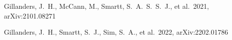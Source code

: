 \documentclass[twocolumn, twocolappendix]{aastex63}
\begin{document}
\begin{itemize}
\begin{thebibliography}{}


 Gillanders, J.~H., McCann, M., Smartt, S.~A.~S.~S.~J., et al.\ 2021, arXiv:2101.08271


 Gillanders, J.~H., Smartt, S.~J., Sim, S.~A., et al.\ 2022, arXiv:2202.01786



























\end{thebibliography}
\end{itemize}
\end{document}

